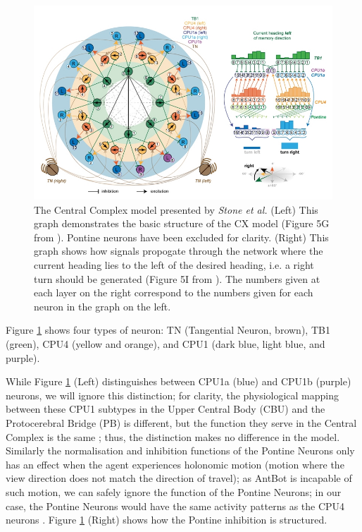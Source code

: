 \documentclass[a4paper,11pt,twoside,openright]{article}
\begin{document}
\begin{figure}[h!]
  \centering
  \includegraphics[width=\textwidth]{StoneCXModel}
  \caption{\label{fig:cx} The Central Complex model presented by
    \textit{Stone et al.} (Left) This graph demonstrates the basic structure of
    the CX model (Figure 5G from \cite{Stone2017}). Pontine neurons have been
    excluded for clarity.
    (Right) This graph shows how signals propogate through the network where the
    current heading lies to the left of the desired heading, i.e. a right turn
    should be generated (Figure 5I from \cite{Stone2017}). The numbers given at
    each layer on the right correspond to the numbers given for each neuron
    in the graph on the left.
  }
\end{figure}

Figure \ref{fig:cx} shows four types of neuron: TN (Tangential Neuron,
brown), TB1 (green), CPU4 (yellow and orange), and CPU1 (dark blue,
light blue, and purple).
\newline
\par

While Figure \ref{fig:cx} (Left) distinguishes between CPU1a (blue) and
CPU1b (purple) neurons, we will ignore this distinction; for clarity, the
physiological mapping between these CPU1 subtypes in the Upper Central Body (CBU)
and the Protocerebral Bridge (PB) is different, but the function they serve in
the Central Complex is the same \cite{Stone2017}; thus, the distinction makes
no difference in the model. Similarly the normalisation and inhibition functions
of the Pontine Neurons only has an effect when the agent experiences holonomic
motion (motion where the view direction does not match the direction of travel);
as AntBot is incapable of such motion, we can safely ignore the function of
the Pontine Neurons; in our case, the Pontine Neurons would have the
same activity patterns as the CPU4 neurons \cite{Stone2017}. Figure \ref{fig:cx}
(Right) shows how the Pontine inhibition is structured.
\newline
\par
\end{document}
